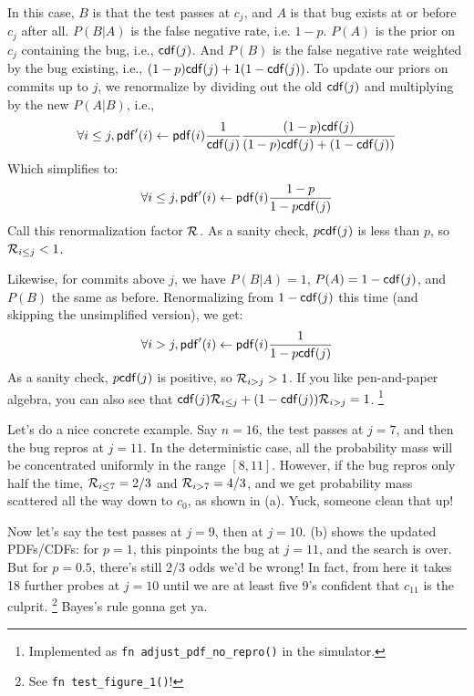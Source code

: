 \documentclass[11pt]{sigplanconf}
\begin{document}
In this case, $B$ is that the test passes at $c_j$, and $A$ is that bug exists at or before $c_j$ after all.
$P(B|A)$ is the false negative rate, i.e. $1-p$.
$P(A)$ is the prior on $c_j$ containing the bug, i.e., $\mathsf{cdf}(j)$.
And $P(B)$ is the false negative rate weighted by the bug existing, i.e., $(1-p)\mathsf{cdf}(j) + 1(1-\mathsf{cdf}(j))$.
To update our priors on commits up to $j$, we renormalize by dividing out the old $\mathsf{cdf}(j)$
and multiplying by the new $P(A|B)$, i.e.,
\[
	\forall i \le j, \mathsf{pdf}'(i)
	\leftarrow
	\mathsf{pdf}(i)
	\frac{1}{\mathsf{cdf}(j)}
	\frac{(1-p)\mathsf{cdf}(j)}{(1-p)\mathsf{cdf}(j) + (1-\mathsf{cdf}(j))}
\]
Which simplifies to:
\[
	\forall i \le j, \mathsf{pdf}'(i)
	\leftarrow
	\mathsf{pdf}(i)
	\frac{1-p}{1 - p\mathsf{cdf}(j)}
\]
Call this renormalization factor $\mathcal{R}_{}$.
As a sanity check, $p\mathsf{cdf}(j)$ is less than $p$, so $\mathcal{R}_{i\le j} < 1$.

Likewise, for commits above $j$, we have $P(B|A) = 1$, $P(A) = 1-\mathsf{cdf}(j)$, and $P(B)$ the same as before.
Renormalizing from $1-\mathsf{cdf}(j)$ this time (and skipping the unsimplified version), we get:
\[
	\forall i > j, \mathsf{pdf}'(i)
	\leftarrow
	\mathsf{pdf}(i)
	\frac{1}{1 - p\mathsf{cdf}(j)}
\]
As a sanity check, $p\mathsf{cdf}(j)$ is positive, so $\mathcal{R}_{i > j} > 1$.
If you like pen-and-paper algebra, you can also see that
$
\mathsf{cdf}(j)
\mathcal{R}_{i \le j}
+
(1-\mathsf{cdf}(j))
\mathcal{R}_{i>j}
= 1$.%
\footnote{Implemented as {\tt fn adjust\_pdf\_no\_repro()} in the simulator.}


Let's do a nice concrete example.
Say $n=16$, the test passes at $j=7$, and then the bug repros at $j=11$.
In the deterministic case, all the probability mass will be concentrated uniformly in the range $[8,11]$.
However, if the bug repros only half the time,
$\mathcal{R}_{i \le 7} = 2/3$
and
$\mathcal{R}_{i > 7} = 4/3$,
and we get probability mass scattered all the way down to $c_0$,
as shown in (a).
Yuck, someone clean that up!

Now let's say the test passes at $j=9$, then at $j=10$.
(b) shows the updated PDFs/CDFs:
for $p=1$, this pinpoints the bug at $j=11$, and the search is over.
But for $p=0.5$, there's still 2/3 odds we'd be wrong!
In fact, from here it takes 18 further probes at $j=10$ until we are at least five 9's confident that $c_{11}$ is the culprit.%
\footnote{See {\tt fn test\_figure\_1()}!}
Bayes's rule gonna get ya.
\end{document}
